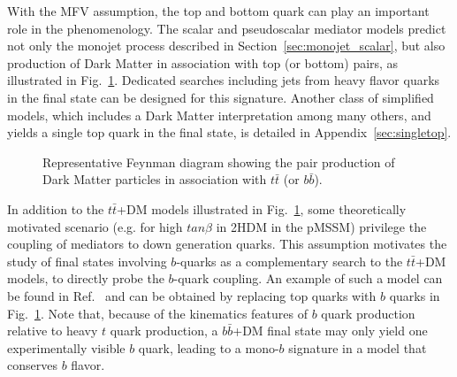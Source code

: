 
With the MFV assumption, the top and bottom
quark can play an important  role in the phenomenology.
The scalar and pseudoscalar mediator models predict not only
the monojet process described in Section~\ref{sec:monojet_scalar}, but also production of Dark Matter
in association with top (or bottom) pairs, as illustrated in Fig.~\ref{fig:TTbarPhi}. 
Dedicated searches including jets from heavy flavor quarks in the final state
can be designed for this signature. Another class of simplified models,  
which includes a Dark Matter interpretation among many others, and yields a single
top quark in the final state, is detailed in Appendix~\ref{sec:singletop}. 

\begin{figure}[h!]
\centering
  \textwidth
  \begin{feynmandiagram}[modelTTbarMET]
  \end{feynmandiagram}
\caption{Representative Feynman
diagram showing the pair production of Dark Matter particles in
association with $t\bar t$ (or $b\bar b$).}
\label{fig:TTbarPhi}
\end{figure}


In addition to the $t\bar t$+DM models illustrated in Fig.~\ref{fig:TTbarPhi}, 
some theoretically motivated scenario (e.g. for high $tan\beta$ in 2HDM in the pMSSM) 
privilege the coupling of \spinzero mediators to down generation quarks.
This assumption motivates the study of final states involving $b$-quarks 
as a complementary search to the $t\bar
t$+DM models, to directly probe the $b$-quark coupling. 
An example of such a model can be found in Ref.~\cite{Buckley:2014fba}
and can be obtained by replacing top quarks with $b$ quarks in Fig.~\ref{fig:TTbarPhi}.
Note that, because of the kinematics features of $b$ quark production relative
to heavy $t$ quark production, a $b\bar b$+DM final state may only yield one
experimentally visible $b$ quark, leading to a mono-$b$ signature in a model that conserves $b$ flavor.

